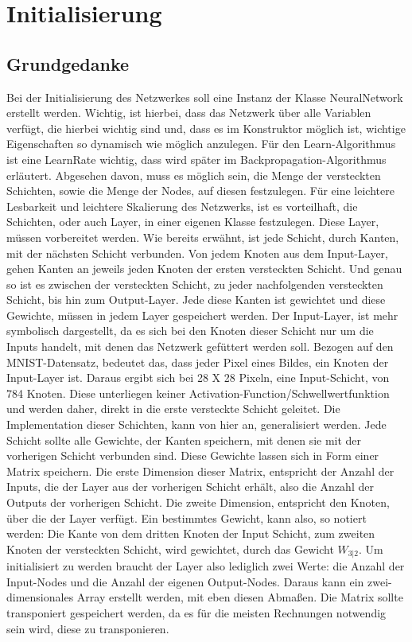 \documentclass[12pt]{article}
\begin{document}
\section{Initialisierung}
\subsection{Grundgedanke}Bei der Initialisierung des Netzwerkes soll eine Instanz der Klasse NeuralNetwork erstellt werden. Wichtig, ist hierbei, dass das Netzwerk über alle Variablen verfügt, die hierbei wichtig sind und, dass es im Konstruktor möglich ist, wichtige Eigenschaften so dynamisch wie möglich anzulegen. Für den Learn-Algorithmus ist eine LearnRate wichtig, dass wird später im Backpropagation-Algorithmus erläutert. Abgesehen davon, muss es möglich sein, die Menge der versteckten Schichten, sowie die Menge der Nodes, auf diesen festzulegen. Für eine leichtere Lesbarkeit und leichtere Skalierung des Netzwerks, ist es vorteilhaft, die Schichten, oder auch Layer, in einer eigenen Klasse festzulegen. Diese Layer, müssen vorbereitet werden. Wie bereits erwähnt, ist jede Schicht, durch Kanten, mit der nächsten Schicht verbunden. Von jedem Knoten aus dem Input-Layer, gehen Kanten an jeweils jeden Knoten der ersten versteckten Schicht. Und genau so ist es zwischen der versteckten Schicht, zu jeder nachfolgenden versteckten Schicht, bis hin zum Output-Layer. Jede diese Kanten ist gewichtet und diese Gewichte, müssen in jedem Layer gespeichert werden. Der Input-Layer, ist mehr symbolisch dargestellt, da es sich bei den Knoten dieser Schicht nur um die Inputs handelt, mit denen das Netzwerk gefüttert werden soll. Bezogen auf den MNIST-Datensatz, bedeutet das, dass jeder Pixel eines Bildes, ein Knoten der Input-Layer ist. Daraus ergibt sich bei 28 X 28 Pixeln, eine Input-Schicht, von 784 Knoten. Diese unterliegen keiner Activation-Function/Schwellwertfunktion und werden daher, direkt in die erste versteckte Schicht geleitet. Die Implementation dieser Schichten, kann von hier an, generalisiert werden. Jede Schicht sollte alle Gewichte, der Kanten speichern, mit denen sie mit der vorherigen Schicht verbunden sind. Diese Gewichte lassen sich in Form einer Matrix speichern. Die erste Dimension dieser Matrix, entspricht der Anzahl der Inputs, die der Layer aus der vorherigen Schicht erhält, also die Anzahl der Outputs der vorherigen Schicht. Die zweite Dimension, entspricht den Knoten, über die der Layer verfügt. Ein bestimmtes Gewicht, kann also, so notiert werden: Die Kante von dem dritten Knoten der Input Schicht, zum zweiten Knoten der versteckten Schicht, wird gewichtet, durch das Gewicht $W_{3|2}$. Um initialisiert zu werden braucht der Layer also lediglich zwei Werte: die Anzahl der Input-Nodes und die Anzahl der eigenen Output-Nodes. Daraus kann ein zwei-dimensionales Array erstellt werden, mit eben diesen Abmaßen. Die Matrix sollte  transponiert gespeichert werden, da es für die meisten Rechnungen notwendig sein wird, diese zu transponieren.
\end{document}
